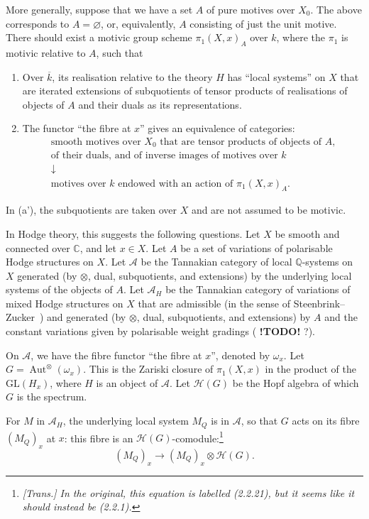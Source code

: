 \documentclass{article}
\theoremstyle{plain}
\theoremstyle{definition}
\newcommand{\sh}{\mathscr}
\newcommand{\QQ}{\mathbb{Q}}
\newcommand{\CC}{\mathbb{C}}
\newcommand{\GL}{\mathrm{GL}}
\DeclareMathOperator{\Aut}{Aut}
\newcommand{\todo}{\textbf{ !TODO! }}
\newcommand{\oldpage}[1]{\marginpar{\footnotesize$\Big\vert$ \textit{p.~#1}}}
\begin{document}
More generally, suppose that we have a set $A$ of pure motives over $X_0$.
The above corresponds to $A=\varnothing$, or, equivalently, $A$ consisting of just the unit motive.
There should exist a motivic group scheme $\pi_1(X,x)_A$ over $k$, where the $\pi_1$ is motivic relative to $A$, such that
\begin{enumerate}[(a')]
  \item Over $\overline{k}$, its realisation relative to the theory $H$ has ``local systems'' on $X$ that are iterated extensions of subquotients of tensor products of realisations of objects of $A$ and their duals as its representations.
  \item The functor ``the fibre at $x$'' gives an equivalence of categories:
    \[
      \begin{gathered}
        \mbox{smooth motives over $X_0$ that are tensor products of objects of $A$,}
      \\\mbox{of their duals, and of inverse images of motives over $k$}
      \\\downarrow
      \\\mbox{motives over $k$ endowed with an action of $\pi_1(X,x)_A$.}
      \end{gathered}
    \]
\end{enumerate}

In (a'), the subquotients are taken over $X$ and are not assumed to be motivic.

In Hodge theory, this suggests the following questions.
Let $X$ be smooth and connected over $\CC$, and let $x\in X$.
Let $A$ be a set of variations of polarisable Hodge structures on $X$.
Let $\sh{A}$ be the Tannakian category of local $\QQ$-systems on $X$ generated (by $\otimes$, dual, subquotients, and extensions) by the underlying local systems of the objects of $A$.
Let $\sh{A}_H$ be the Tannakian category of variations of mixed Hodge structures on $X$ that are admissible (in the sense of Steenbrink--Zucker~\cite{30}) and generated (by $\otimes$, dual, subquotients, and extensions) by $A$ and the constant variations given by polarisable weight gradings (\todo?).

On $\sh{A}$, we have the fibre functor ``the fibre at $x$'', denoted by $\omega_x$.
Let $G=\Aut^\otimes(\omega_x)$.
This is the Zariski closure of $\pi_1(X,x)$ in the product of the $\GL(H_x)$, where $H$ is an object of $\sh{A}$.
Let $\sh{H}(G)$ be the Hopf algebra of which $G$ is the spectrum.

\oldpage{154}
For $M$ in $\sh{A}_H$, the underlying local system $M_Q$ is in $\sh{A}$, so that $G$ acts on its fibre $(M_Q)_x$ at $x$: this fibre is an $\sh{H}(G)$-comodule:\footnote{\emph{[Trans.] In the original, this equation is labelled (2.2.21), but it seems like it should instead be (2.2.1).}}
\[
\label{2.2.1}
  (M_Q)_x \to (M_Q)_x\otimes\sh{H}(G).
\tag{2.2.1}
\]
\end{document}
